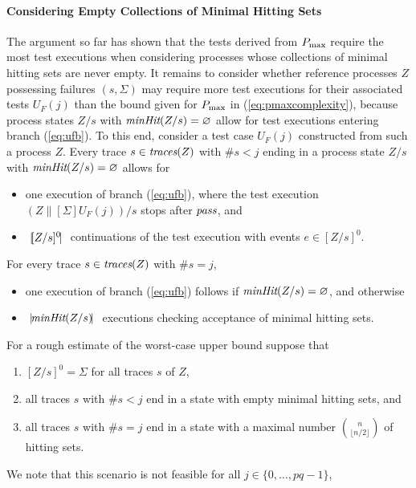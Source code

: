 \paragraph{Considering Empty Collections of Minimal Hitting Sets}
The argument so far has shown that the tests derived from $P_\text{max}$ require the
most test executions when considering processes whose collections of minimal
hitting sets are never empty. %
%
It remains to consider whether reference processes $Z$ possessing failures
$(s,\Sigma)$ may require more test executions for their associated tests
$U_F(j)$ than the bound given for $P_\text{max}$ in (\ref{eq:pmaxcomplexity}),
because process states $Z/s$ with $\text{\it minHit}(Z/s)=\varnothing$ allow for test
executions entering branch (\ref{eq:ufb}). To this end, consider a test case
$U_F(j)$ constructed from such a process $Z$. Every trace $s\in\text{\it traces}(Z)$ with
$\#s<j$ ending in a process state $Z/s$ with $\text{\it minHit}(Z/s)=\varnothing$
allows for
%
\begin{itemize}
\item one execution of branch (\ref{eq:ufb}), where the test execution
$(Z\parallel[\Sigma]U_F(j))/s$ stops after ${\text{\it pass}}$, and
\item ${~|\! [Z/s]^0\!|~}$   continuations of the test execution with events $e\in [Z/s]^0$.
\end{itemize}
%
For every trace $s\in\text{\it traces}(Z)$ with $\#s=j$,
%
\begin{itemize}
\item one execution of branch (\ref{eq:ufb}) follows if
$\text{\it minHit}(Z/s)=\varnothing$, and otherwise
\item ${~|\! \text{\it minHit}(Z/s)\!|~}$ executions checking acceptance of minimal hitting sets.
\end{itemize}
%
For a rough estimate of the worst-case upper bound suppose that
%
\begin{enumerate}
\item $[Z/s]^0 = \Sigma$ for all traces $s$ of $Z$,
\item all traces $s$ with $\#s<j$ end in a state with empty minimal hitting sets, and
\item all traces $s$ with $\#s=j$ end in a state with a maximal number $\binom{n}{\lfloor n/2\rfloor}$
 of hitting sets.
\end{enumerate}
%
We note that this scenario is not feasible for all $j\in\{0,\dots,pq-1\}$,
